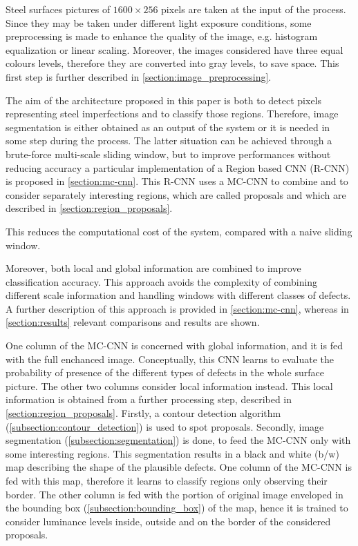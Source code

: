     \par{
        Steel surfaces pictures of $1600\times 256$ pixels are taken at the input of the process. Since they may be taken under different light exposure conditions, some preprocessing is made to enhance the quality of the image, e.g. histogram equalization or linear scaling. Moreover, the images considered have three equal colours levels, therefore they are converted into gray levels, to save space. This first step is further described in \ref{section:image_preprocessing}.
    }
    \par{
        The aim of the architecture proposed in this paper is both to detect pixels representing steel imperfections and to classify those regions. Therefore, image segmentation is either obtained as an output of the system or it is needed in some step during the process. The latter situation can be achieved through a brute-force multi-scale sliding window, but to improve performances without reducing accuracy a particular implementation of a Region based CNN (R-CNN) \cite{ieee:7410526,ieee:7532516} is proposed in \ref{section:mc-cnn}. This R-CNN uses a MC-CNN to combine and to consider separately interesting regions, which are called proposals and which are described in \ref{section:region_proposals}.
    }
    \par{
        This reduces the computational cost of the system, compared with a naive sliding window.
    }
    \par{
        Moreover, both local and global information are combined to improve classification accuracy. This approach avoids the complexity of combining different scale information and handling windows with different classes of defects. A further description of this approach is provided in \ref{section:mc-cnn}, whereas in \ref{section:results} relevant comparisons and results are shown.
    }
    \par{
        One column of the MC-CNN is concerned with global information, and it is fed with the full enchanced image. Conceptually, this CNN learns to evaluate the probability of presence of the different types of defects in the whole surface picture. The other two columns consider local information instead. This local information is obtained from a further processing step, described in \ref{section:region_proposals}. Firstly, a contour detection algorithm (\ref{subsection:contour_detection}) is used to spot proposals. Secondly, image segmentation (\ref{subsection:segmentation}) is done, to feed the MC-CNN only with some interesting regions. This segmentation results in a black and white (b/w) map describing the shape of the plausible defects. One column of the MC-CNN is fed with this map, therefore it learns to classify regions only observing their border. The other column is fed with the portion of original image enveloped in the bounding box (\ref{subsection:bounding_box}) of the map, hence it is trained to consider luminance levels inside, outside and on the border of the considered proposals.
    }
